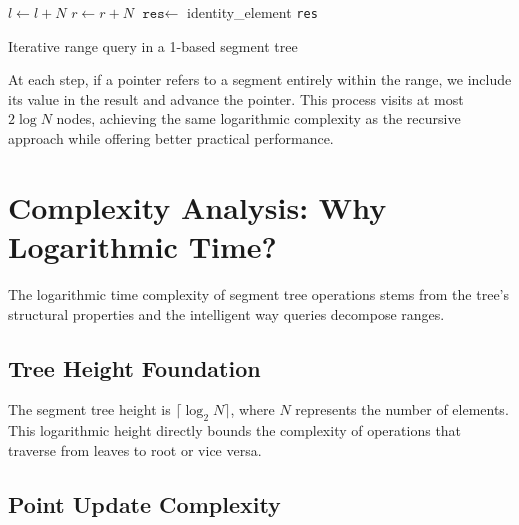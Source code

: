 \begin{algorithm}[H]
\SetAlgoLined
\KwIn{Range $[l, r)$ to query}
$l \leftarrow l + N$\;
$r \leftarrow r + N$\;
$\texttt{res} \leftarrow$ identity\_element\;
\Return \texttt{res}\;
\caption{Iterative range query in a 1-based segment tree}
\end{algorithm}


At each step, if a pointer refers to a segment entirely within the range, we include its value in the result and advance the pointer. This process visits at most $2\log N$ nodes, achieving the same logarithmic complexity as the recursive approach while offering better practical performance.

\section{Complexity Analysis: Why Logarithmic Time?}
\label{sec:complexity_proofs}

The logarithmic time complexity of segment tree operations stems from the tree's structural properties and the intelligent way queries decompose ranges.

\subsection{Tree Height Foundation}

The segment tree height is $\lceil \log_2 N \rceil$, where $N$ represents the number of elements. This logarithmic height directly bounds the complexity of operations that traverse from leaves to root or vice versa.

\subsection{Point Update Complexity}

